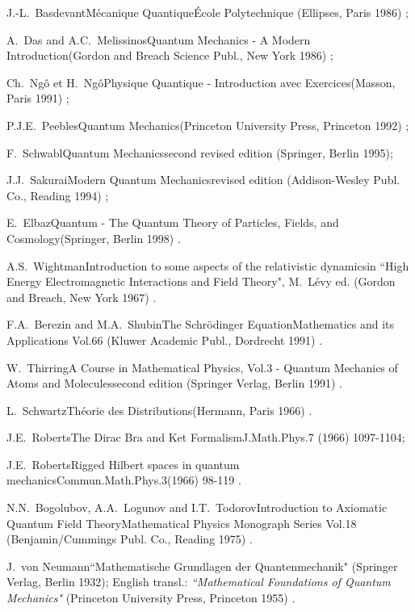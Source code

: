 \documentclass[12pt]{report}
\begin{document}
\begin{thebibliography}{22}
\bookref
{J.-L.~Basdevant}{M\'ecanique Quantique}{\'Ecole Polytechnique
(Ellipses, Paris 1986) ;}
 
\bookref
{A.~Das and A.C.~Melissinos}{Quantum Mechanics - A Modern
Introduction}{(Gordon and Breach Science Publ., New York 1986) ;}
 
\bookref
{Ch.~Ng\^o et H.~Ng\^o}{Physique Quantique - Introduction avec
Exercices}{(Masson, Paris 1991) ;}
 
\bookref
{P.J.E.~Peebles}{Quantum Mechanics}{(Princeton University Press,
Princeton 1992) ;}

\bookref
{F.~Schwabl}{Quantum Mechanics}{second revised edition (Springer, Berlin 
1995);}

\bookref
{J.J.~Sakurai}{Modern Quantum Mechanics}{revised edition
(Addison-Wesley Publ. Co., Reading 1994) ;}
 
\bookref
{E.~Elbaz}{Quantum - The Quantum Theory of Particles, 
Fields, and Cosmology}{(Springer, Berlin 
1998) .}


\prepref
{A.S.~Wightman}{Introduction to some aspects of the relativistic
dynamics}{in ``High Energy Electromagnetic Interactions and
Field Theory", M.~L\'evy ed. (Gordon and Breach, New York 1967) .}

 
\bookref
{F.A.~Berezin and M.A.~Shubin}{The Schr\"odinger Equation}{Mathematics
and its Applications Vol.66 (Kluwer Academic Publ., Dordrecht 1991) .}
 
\bookref
{W.~Thirring}{A
Course in Mathematical Physics, Vol.3 -
Quantum Mechanics of Atoms and Molecules}{second edition
(Springer Verlag, Berlin 1991) .}
  

\bookref
{L.~Schwartz}{Th\'eorie des Distributions}{(Hermann, Paris 1966) .}

 
\artref
{J.E.~Roberts}{The Dirac Bra and Ket Formalism}{J.Math.Phys.}{7}{
(1966) 1097-1104;}
 
\artref
{J.E.~Roberts}{Rigged Hilbert spaces in quantum
mechanics}{Commun.Math.Phys.}{3}{(1966) 98-119 .}

 
\bookref
{N.N.~Bogolubov, A.A.~Logunov and I.T.~Todorov}{Introduction to
Axiomatic Quantum Field Theory}{Mathematical Physics Monograph
Series Vol.18 (Benjamin/Cummings Publ. Co., Reading 1975) .}

 
\prepref
{J.~von Neumann}{``Mathematische Grundlagen der Quantenmechanik"}{
(Springer Verlag, Berlin 1932); English transl.: {\it
``Mathematical Foundations of Quantum Mechanics"}
(Princeton University Press, Princeton 1955) .}
 

\end{thebibliography}
\end{document}
